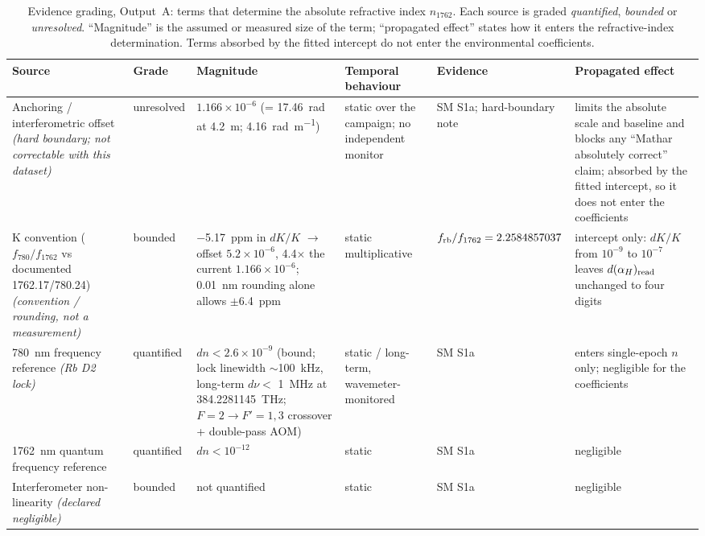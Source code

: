 \documentclass[aps,prapplied,reprint,superscriptaddress]{revtex4-2}
\begin{document}
\begin{table}[tbp]
\centering
\caption{Evidence grading, Output~A: terms that determine the absolute refractive index $n_{1762}$. Each source is graded \emph{quantified}, \emph{bounded} or \emph{unresolved}. ``Magnitude'' is the assumed or measured size of the term; ``propagated effect'' states how it enters the refractive-index determination. Terms absorbed by the fitted intercept do not enter the environmental coefficients.}
\label{tab:S4a}
\footnotesize
\setlength{\tabcolsep}{4pt}
\begin{tabular}{@{}p{}p{}p{}p{}p{}p{}@{}}
\hline
\textbf{Source} & \textbf{Grade} & \textbf{Magnitude} & \textbf{Temporal behaviour} & \textbf{Evidence} & \textbf{Propagated effect} \\
\hline
Anchoring / interferometric offset \emph{(hard boundary; not correctable with this dataset)} & unresolved & $1.166\times10^{-6}$ (= \SI{17.46}{\radian} at \SI{4.2}{\meter}; \SI{4.16}{\radian\per\meter}) & static over the campaign; no independent monitor & SM S1a; hard-boundary note & limits the absolute scale and baseline and blocks any ``Mathar absolutely correct'' claim; absorbed by the fitted intercept, so it does not enter the coefficients  \\
K convention ($f_{780}/f_{1762}$ vs documented 1762.17/780.24) \emph{(convention / rounding, not a measurement)} & bounded & \SI{-5.17}{ppm} in $dK/K$ $\to$ offset $5.2\times10^{-6}$, 4.4$\times$ the current $1.166\times10^{-6}$; \SI{0.01}{\nano\meter} rounding alone allows $\pm$\SI{6.4}{ppm} & static multiplicative & $f_{\rm rb}/f_{1762} = 2.2584857037$ & intercept only: $dK/K$ from $10^{-9}$ to $10^{-7}$ leaves $d(\alpha_H)_{\rm read}$ unchanged to four digits  \\
\SI{780}{\nano\meter} frequency reference \emph{(Rb D2 lock)} & quantified & $dn < 2.6\times10^{-9}$ (bound; lock linewidth $\sim$\SI{100}{\kilo\hertz}, long-term $d\nu <$ \SI{1}{\mega\hertz} at \SI{384.2281145}{\tera\hertz}; $F=2\to F'=1,3$ crossover + double-pass AOM) & static / long-term, wavemeter-monitored & SM S1a & enters single-epoch $n$ only; negligible for the coefficients \\
\SI{1762}{\nano\meter} quantum frequency reference & quantified & $dn < 10^{-12}$ & static & SM S1a & negligible \\
Interferometer non-linearity \emph{(declared negligible)} & bounded & not quantified & static & SM S1a & negligible \\

\end{tabular}
\end{table}
\end{document}
